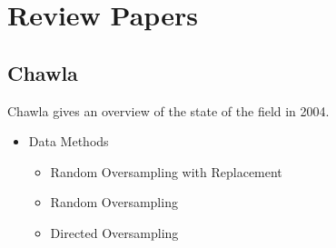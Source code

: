 \section{Review Papers}

\subsection{Chawla}
Chawla \cite{CHAWLA_2004} gives an overview of the state of the field in 2004.

\begin{itemize}
	\item Data Methods
	\begin{itemize}
		\item Random Oversampling with Replacement
		\item Random Oversampling
		\item Directed Oversampling
		

\end{itemize}
\end{itemize}
